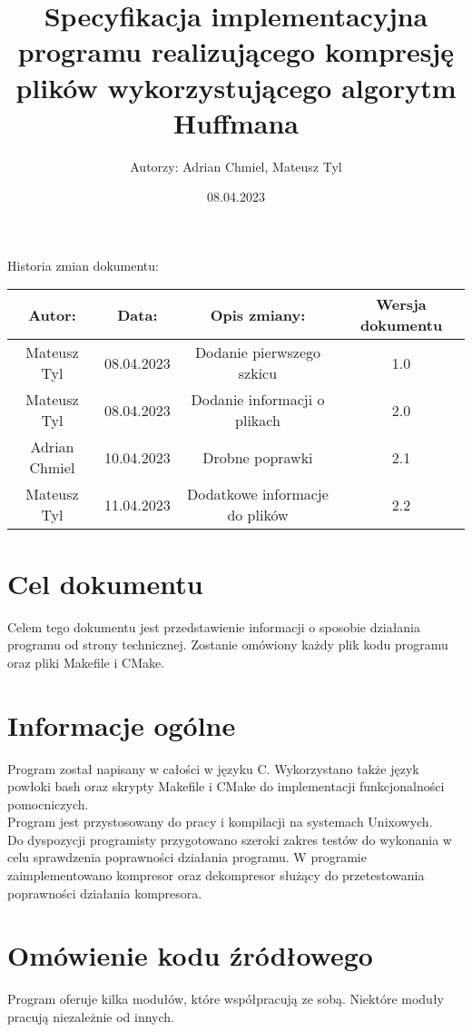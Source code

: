 \documentclass[]{article}
\title{Specyfikacja implementacyjna programu realizującego kompresję plików wykorzystującego algorytm Huffmana}
\author{Autorzy: Adrian Chmiel, Mateusz Tyl}
\date{08.04.2023}
\begin{document}
\maketitle
\begin{center}
Historia zmian dokumentu:\\
\end{center}

\begin{tabular}{|c|c|c|c|}
  \hline 
  Autor: & Data: & Opis zmiany:& Wersja dokumentu \\
  \hline
  Mateusz Tyl & 08.04.2023 & Dodanie pierwszego szkicu & 1.0 \\
\hline
  Mateusz Tyl & 08.04.2023 & Dodanie informacji o plikach & 2.0 \\
\hline
  Adrian Chmiel & 10.04.2023 & Drobne poprawki & 2.1 \\
\hline
  Mateusz Tyl & 11.04.2023 & Dodatkowe informacje do plików & 2.2 \\
\hline
\end{tabular} 
\section{Cel dokumentu}\label{header-n231}

Celem tego dokumentu jest przedstawienie informacji o sposobie działania programu od strony technicznej. Zostanie omówiony każdy plik kodu programu oraz pliki Makefile i CMake.
\section{Informacje ogólne}\label{header-n231}
Program został napisany w całości w języku C. Wykorzystano także język powłoki bash oraz skrypty Makefile i CMake do implementacji funkcjonalności pomocniczych.\\
Program jest przystosowany do pracy i kompilacji na systemach Unixowych.\\
Do dyspozycji programisty przygotowano szeroki zakres testów do wykonania w celu sprawdzenia poprawności działania programu.
W programie zaimplementowano kompresor oraz dekompresor służący do przetestowania poprawności działania kompresora.

\section{Omówienie kodu źródłowego}\label{header-n231}
Program oferuje kilka modułów, które współpracują ze sobą. Niektóre moduły pracują niezależnie od innych.
\end{document}
